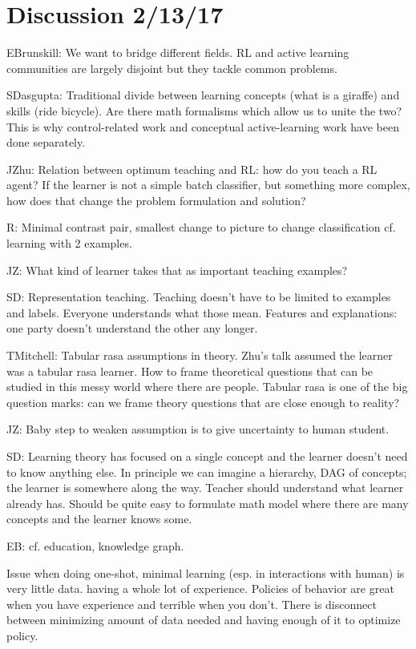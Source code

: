 \section{Discussion 2/13/17}

EBrunskill: We want to bridge different fields. RL and active learning communities are largely disjoint but they tackle common problems.

SDasgupta: Traditional divide between learning concepts (what is a giraffe) and skills (ride bicycle). Are there math formalisms which allow us to unite the two?  This is why control-related work and conceptual active-learning work have been done separately.

JZhu: Relation between optimum teaching and RL: how do you teach a RL agent?
If the learner is not a simple batch classifier, but something more complex, how does that change the problem formulation and solution?

R: Minimal contrast pair, smallest change to picture to change classification cf. learning with 2 examples. 

JZ: What kind of learner takes that as important teaching examples? %

SD: Representation teaching. Teaching doesn't have to be limited to examples and labels. Everyone understands what those mean. Features and explanations: one party doesn't understand the other any longer.

TMitchell: Tabular rasa assumptions in theory. Zhu's talk assumed the learner was a tabular rasa learner. How to frame theoretical questions that can be studied in this messy world where there are people. Tabular rasa is one of the big question marks: can we frame theory questions that are close enough to reality?

JZ: Baby step to weaken assumption is to give uncertainty to human student.

SD: Learning theory has focused on a single concept and the learner doesn't need to know anything else. In principle we can imagine a hierarchy, DAG of concepts; the learner is somewhere along the way. Teacher should understand what learner already has. Should be quite easy to formulate math model where there are many concepts and the learner knows some.

EB: cf. education, knowledge graph.

Issue when doing one-shot, minimal learning (esp. in interactions with human) is very little data. having a whole lot of experience. Policies of behavior are great when you have experience and terrible when you don't. There is disconnect between minimizing amount of data needed and having enough of it to optimize policy.


